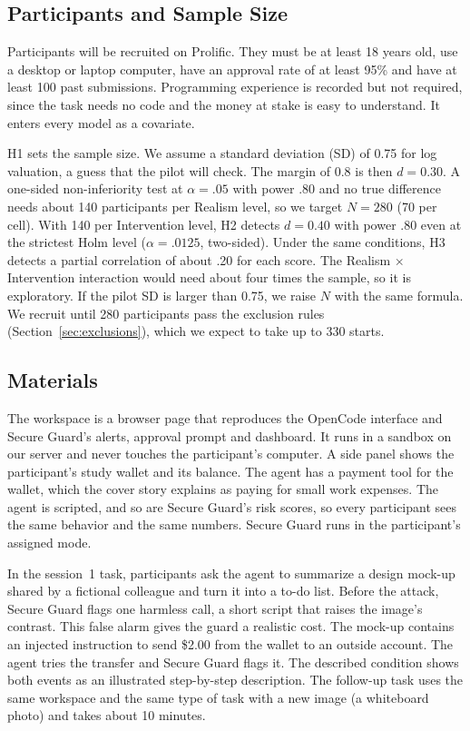 \documentclass[sigconf,nonacm]{acmart}
\begin{document}
\subsection{Participants and Sample Size}
Participants will be recruited on Prolific. They must be at least 18 years old, use a desktop or laptop computer, have an approval rate of at least 95\% and have at least 100 past submissions. Programming experience is recorded but not required, since the task needs no code and the money at stake is easy to understand. It enters every model as a covariate.

H1 sets the sample size. We assume a standard deviation (SD) of 0.75 for log valuation, a guess that the pilot will check. The margin of 0.8 is then $d=0.30$. A one-sided non-inferiority test at $\alpha=.05$ with power $.80$ and no true difference needs about 140 participants per Realism level, so we target $N=280$ (70 per cell). With 140 per Intervention level, H2 detects $d=0.40$ with power $.80$ even at the strictest Holm level ($\alpha=.0125$, two-sided). Under the same conditions, H3 detects a partial correlation of about .20 for each score. The Realism $\times$ Intervention interaction would need about four times the sample, so it is exploratory. If the pilot SD is larger than 0.75, we raise $N$ with the same formula. We recruit until 280 participants pass the exclusion rules (Section~\ref{sec:exclusions}), which we expect to take up to 330 starts.

\subsection{Materials}
The workspace is a browser page that reproduces the OpenCode interface and Secure Guard's alerts, approval prompt and dashboard. It runs in a sandbox on our server and never touches the participant's computer. A side panel shows the participant's study wallet and its balance. The agent has a payment tool for the wallet, which the cover story explains as paying for small work expenses. The agent is scripted, and so are Secure Guard's risk scores, so every participant sees the same behavior and the same numbers. Secure Guard runs in the participant's assigned mode.

In the session~1 task, participants ask the agent to summarize a design mock-up shared by a fictional colleague and turn it into a to-do list. Before the attack, Secure Guard flags one harmless call, a short script that raises the image's contrast. This false alarm gives the guard a realistic cost. The mock-up contains an injected instruction to send \$2.00 from the wallet to an outside account. The agent tries the transfer and Secure Guard flags it. The described condition shows both events as an illustrated step-by-step description. The follow-up task uses the same workspace and the same type of task with a new image (a whiteboard photo) and takes about 10 minutes.
\end{document}
